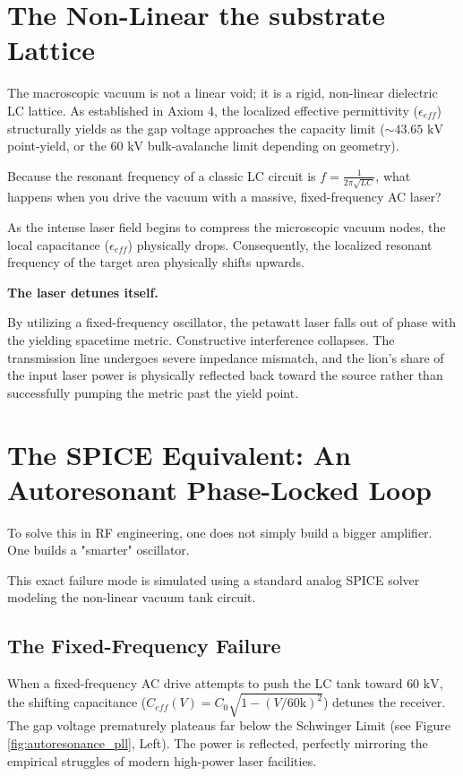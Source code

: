 \section{The Non-Linear the substrate Lattice}
The macroscopic vacuum is not a linear void; it is a rigid, non-linear dielectric LC lattice. As established in Axiom 4, the localized effective permittivity ($\epsilon_{eff}$) structurally yields as the gap voltage approaches the capacity limit ($\sim 43.65 \text{ kV}$ point-yield, or the $60 \text{ kV}$ bulk-avalanche limit depending on geometry).

Because the resonant frequency of a classic LC circuit is $f = \frac{1}{2\pi\sqrt{LC}}$, what happens when you drive the vacuum with a massive, fixed-frequency AC laser?

As the intense laser field begins to compress the microscopic vacuum nodes, the local capacitance ($\epsilon_{eff}$) physically drops. Consequently, the localized resonant frequency of the target area physically shifts upwards. 

\textbf{The laser detunes itself.} 

By utilizing a fixed-frequency oscillator, the petawatt laser falls out of phase with the yielding spacetime metric. Constructive interference collapses. The transmission line undergoes severe impedance mismatch, and the lion's share of the input laser power is physically reflected back toward the source rather than successfully pumping the metric past the yield point.

\section{The SPICE Equivalent: An Autoresonant Phase-Locked Loop}
To solve this in RF engineering, one does not simply build a bigger amplifier. One builds a "smarter" oscillator.

This exact failure mode is simulated using a standard analog SPICE solver modeling the non-linear vacuum tank circuit.

\subsection{The Fixed-Frequency Failure}
When a fixed-frequency AC drive attempts to push the LC tank toward $60 \text{ kV}$, the shifting capacitance ($C_{eff}(V) = C_0 \sqrt{1 - (V/60\text{k})^2}$) detunes the receiver. The gap voltage prematurely plateaus far below the Schwinger Limit (see Figure \ref{fig:autoresonance_pll}, Left). The power is reflected, perfectly mirroring the empirical struggles of modern high-power laser facilities.

